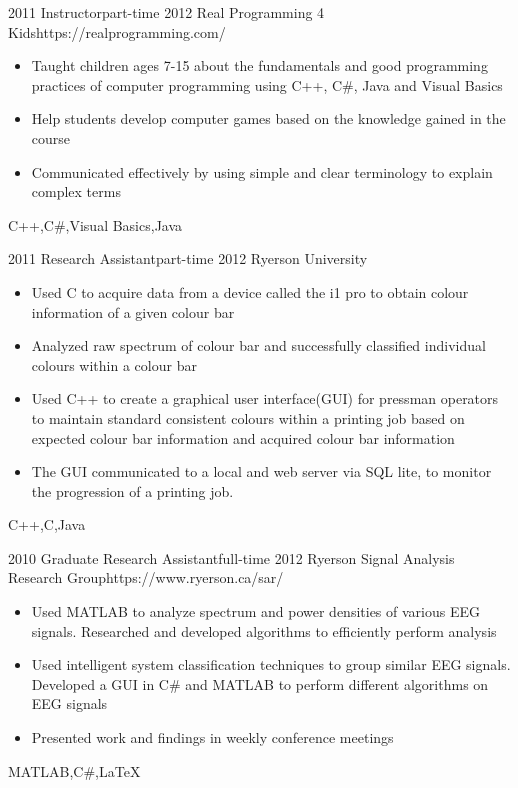 \begin{experiences}
	\emptySeparator
	
	
	\myExperience
	{2011}       {Instructor}{part-time}
	{2012}      {Real Programming 4 Kids}{https://realprogramming.com/}
	{
		\begin{itemize}
			\item Taught children ages 7-15 about the fundamentals and good programming practices of computer programming using C++, C\#, Java and Visual Basics
			\item Help students develop computer games based on the knowledge gained in the course
			\item Communicated effectively by using simple and clear terminology to explain complex terms
		\end{itemize}
	}
	{C++,C\#,Visual Basics,Java}
	
	\emptySeparator

	\myExperience
	{2011}       {Research Assistant}{part-time}
	{2012}      {Ryerson University}{}
	{
		\begin{itemize}
			\item Used C to acquire data from a device called the i1 pro to obtain colour information of a given colour bar
			\item Analyzed raw spectrum of colour bar and successfully classified individual colours within a colour bar
			\item Used C++ to create a graphical user interface(GUI) for pressman operators to 	maintain standard consistent colours within a printing job based on expected colour bar information and acquired colour bar information
			\item The GUI communicated to a local and web server via SQL lite, to monitor the progression of a printing job.
		\end{itemize}
	}
	{C++,C,Java}
	
	\emptySeparator
	
	\myExperience
	{2010}       {Graduate Research Assistant}{full-time}
	{2012}      {Ryerson Signal Analysis Research Group}{https://www.ryerson.ca/sar/}
	{
		\begin{itemize}
			\item Used MATLAB to analyze spectrum and power densities of various EEG signals. Researched and developed algorithms to efficiently perform analysis
			\item Used intelligent system classification techniques to group similar EEG signals. Developed a GUI in C\# and MATLAB to perform different algorithms on EEG signals
			\item  Presented work and findings in weekly conference meetings
		\end{itemize}
	}
	{MATLAB,C\#,\LaTeX}
	
\end{experiences}

